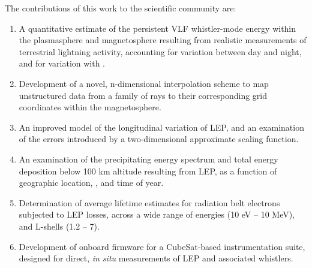 The contributions of this work to the scientific community are:
\begin{enumerate}
\item A quantitative estimate of the persistent VLF whistler-mode energy within the plasmasphere and magnetosphere resulting from realistic measurements of terrestrial lightning activity, accounting for variation between day and night, and for variation with \kp{}.

\item Development of a novel, n-dimensional interpolation scheme to map unstructured data from a family of rays to their corresponding grid coordinates within the magnetosphere.

\item An improved model of the longitudinal variation of LEP, and an examination of the errors introduced by a two-dimensional approximate scaling function.

\item An examination of the precipitating energy spectrum and total energy deposition below 100 km altitude resulting from LEP, as a function of geographic location, \kp{}, and time of year.

\item Determination of average lifetime estimates for radiation belt electrons subjected to LEP losses, across a wide range of energies (10 eV -- 10 MeV), and L-shells (1.2 -- 7).

\item Development of onboard firmware for a CubeSat-based instrumentation suite, designed for direct, \emph{in situ} measurements of LEP and associated whistlers.
\end{enumerate}
